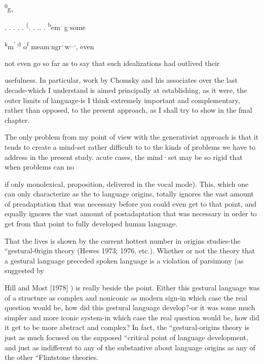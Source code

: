 \textsuperscript{0}g,

\textsuperscript{{\textquotedbl}}. . . . .\textsuperscript{{\textquotedbl}} \textsuperscript{(}\textsuperscript{{\textquotedbl}}. . .. .\textsuperscript{{\textquotedbl}} \textsuperscript{b}em\textsuperscript{.} g some

\textsuperscript{k}m\textsuperscript{'} \textsuperscript{d} o\textsuperscript{f} meam\textsuperscript{.}ngr\textsuperscript{,}\textsuperscript{.}w\textsuperscript{\_}\textsuperscript{,}, even

not even go so far as to say that such idealizations had outlived their

usefulness. In particular, work by Chomsky and his associates over the last decade-which I understand is aimed principally at establishing, as it were, the outer limits of language-is I think extremely important and complementary, rather than opposed, to the present approach, as I shall try to show in the fmal chapter.

The only problem from my point of view with the generativist approach is that it tends to create a mind-set rather difficult to
to the kinds of problems we have to address in the present study. acute cases, the mind·set may be so rigid that when problems can no


if only monolexical, proposition, delivered in the vocal mode). This, which one can only characterize as the  to lan\-guage origins, totally ignores the vast amount of preadaptation that was necessary before you could even get to that point, and equally ignores the vast amount of postadaptation that was necessary in order to get from that point to fully developed human language.

That the  lives is shown by the current hottest number in origins studies-the ``gestural-0rigin theory (Hewes 1973; 1976, etc.). Whether or not the theory that a gestural language preceded spoken language is a violation of parsimony (as suggested by


Hill and Most [1978] ) is really beside the point. Either this gestural language was of a structure as complex and noniconic as modern sign-in which case the real question would be, how did this gestural language develop?-or it was some much simpler and more iconic system-in which case the real question would be, how did it get to be more abstract and complex? In fact, the ``gestural-origins theory is just as much focused on the supposed ``critical point of language development, and just as indifferent to any of the substantive  about language origins as any of the other ``Flintstone theories.

